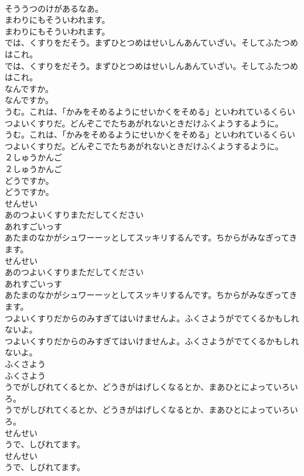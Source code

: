 \documentclass[8pt]{extreport}
\begin{document}
\begin{CJK}{UTF8}{min}
\\	そううつのけがあるなあ。
\\	まわりにもそういわれます。
\\	まわりにもそういわれます。
\\	では、くすりをだそう。まずひとつめはせいしんあんていざい。そしてふたつめはこれ。
\\	では、くすりをだそう。まずひとつめはせいしんあんていざい。そしてふたつめはこれ。
\\	なんですか。
\\	なんですか。
\\	うむ。これは、「かみをそめるようにせいかくをそめる」といわれているくらいつよいくすりだ。どんぞこでたちあがれないときだけふくようするように。
\\	うむ。これは、「かみをそめるようにせいかくをそめる」といわれているくらいつよいくすりだ。どんぞこでたちあがれないときだけふくようするように。
\\	２しゅうかんご
\\	２しゅうかんご
\\	どうですか。
\\	どうですか。
\\	せんせい
\\	あのつよいくすりまただしてください
\\	あれすごいっす
\\	あたまのなかがシュワーーッとしてスッキリするんです。ちからがみなぎってきます。
\\	せんせい
\\	あのつよいくすりまただしてください
\\	あれすごいっす
\\	あたまのなかがシュワーーッとしてスッキリするんです。ちからがみなぎってきます。
\\	つよいくすりだからのみすぎてはいけませんよ。ふくさようがでてくるかもしれないよ。
\\	つよいくすりだからのみすぎてはいけませんよ。ふくさようがでてくるかもしれないよ。
\\	ふくさよう
\\	ふくさよう
\\	うでがしびれてくるとか、どうきがはげしくなるとか、まあひとによっていろいろ。
\\	うでがしびれてくるとか、どうきがはげしくなるとか、まあひとによっていろいろ。
\\	せんせい
\\	うで、しびれてます。
\\	せんせい
\\	うで、しびれてます。

\end{CJK}
\end{document}
